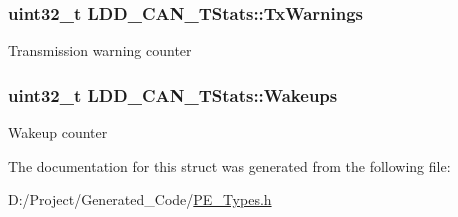 \subsubsection[{Tx\+Warnings}]{\setlength{\rightskip}{0pt plus 5cm}uint32\+\_\+t L\+D\+D\+\_\+\+C\+A\+N\+\_\+\+T\+Stats\+::\+Tx\+Warnings}\label{struct_l_d_d___c_a_n___t_stats_a46ea9a5839da88b7e7b596ac34b72f90}
Transmission warning counter \hypertarget{struct_l_d_d___c_a_n___t_stats_ab59425105119b5b6496a6e0fcc8398d5}{}
\subsubsection[{Wakeups}]{\setlength{\rightskip}{0pt plus 5cm}uint32\+\_\+t L\+D\+D\+\_\+\+C\+A\+N\+\_\+\+T\+Stats\+::\+Wakeups}\label{struct_l_d_d___c_a_n___t_stats_ab59425105119b5b6496a6e0fcc8398d5}
Wakeup counter 

The documentation for this struct was generated from the following file\+:\begin{DoxyCompactItemize}
\item 
D\+:/\+Project/\+Generated\+\_\+\+Code/\hyperlink{_p_e___types_8h}{P\+E\+\_\+\+Types.\+h}\end{DoxyCompactItemize}
